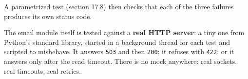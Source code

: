 \begin{codebox}
\end{codebox}

\noindent{}A parametrized test (section 17.8) then checks that each of the three failures produces its own status code.

The email module itself is tested against a \textbf{real HTTP server}: a tiny one from Python's standard library, started in a background thread for each test and scripted to misbehave. It answers \texttt{503} and then \texttt{200}; it refuses with \texttt{422}; or it answers only after the read timeout. There is no mock anywhere: real sockets, real timeouts, real retries.

\begin{codebox}[short]

\begin{Shaded}
\begin{Highlighting}[]
\OperatorTok{=}\NormalTok{ [(}\NormalTok{, \{}\NormalTok{: }\NormalTok{\}, }\NormalTok{), (}\NormalTok{, \{\}, }\NormalTok{)]}
    \NormalTok{, }\NormalTok{, }\NormalTok{) }\OperatorTok{==} 
\OperatorTok{=}\NormalTok{ [r[}\NormalTok{][}\NormalTok{] }\NormalTok{ email\_service.requests]}
     \OperatorTok{==}  \NormalTok{ keys[}\NormalTok{] }\OperatorTok{==}\NormalTok{ keys[}\NormalTok{]}


\OperatorTok{=}\NormalTok{ [(}\NormalTok{, \{\}, }\NormalTok{)]  }
\NormalTok{, }\NormalTok{, }\NormalTok{)}
     \OperatorTok{==}   
\end{Highlighting}
\end{Shaded}

\end{codebox}

